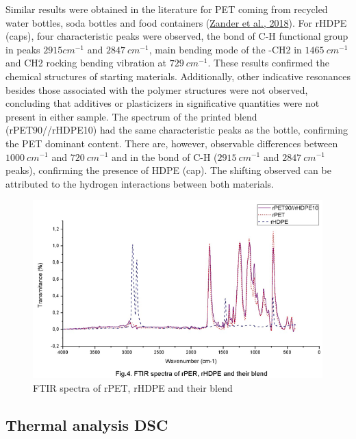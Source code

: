 \documentclass[
  12pt,
  number,
  review]{elsarticle}
\begin{document}
Similar results were obtained in the literature for PET coming from
recycled water bottles, soda bottles and food containers
(\protect\hyperlink{ref-zander2018}{Zander et al., 2018}). For rHDPE
(caps), four characteristic peaks were observed, the bond of C-H
functional group in peaks \(2915cm^{-1}\) and \(2847~cm^{-1}\), main
bending mode of the -CH2 in \(1465~cm^{-1}\) and CH2 rocking bending
vibration at \(729 ~cm^{-1}\). These results confirmed the chemical
structures of starting materials. Additionally, other indicative
resonances besides those associated with the polymer structures were not
observed, concluding that additives or plasticizers in significative
quantities were not present in either sample. The spectrum of the
printed blend (rPET90//rHDPE10) had the same characteristic peaks as the
bottle, confirming the PET dominant content. There are, however,
observable differences between \(1000 ~cm^{-1}\) and \(720 ~cm^{-1}\)
and in the bond of C-H (\(2915~cm^{-1}\) and \(2847 ~cm^{-1}\) peaks),
confirming the presence of HDPE (cap). The shifting observed can be
attributed to the hydrogen interactions between both materials.

\begin{figure}

{\centering \includegraphics{figures/Figure_4.png}

}

\caption{FTIR spectra of rPET, rHDPE and their blend}

\end{figure}

\hypertarget{thermal-analysis-dsc}{%
\subsection{Thermal analysis DSC}\label{thermal-analysis-dsc}}
\end{document}
